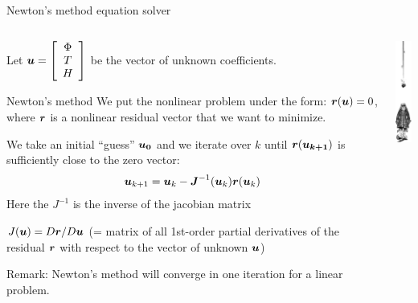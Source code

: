 \begin{frame}{Newton's method equation solver}

  \tiny

  \begin{columns}
  \begin{column}{9cm}
    Let $ \boldsymbol{u} = \left[\begin{array}{c} \Phi\\ T\\  H\\ \end{array}\right] $ be the vector of unknown coefficients.

  \begin{block}{Newton's method}
    We put the nonlinear problem under the form:
    $
      \boldsymbol{r} ( \boldsymbol{u} ) = 0 \nonumber
    $,
    where $ \boldsymbol{r} $ is a nonlinear residual vector that we want to minimize.

    We take an initial ``guess'' $ \boldsymbol{u_{0}} $ and we iterate over $ k $ until $ \boldsymbol{r} (\boldsymbol{u_{k+1}} ) $ is sufficiently close to the zero vector:
    \begin{align}
      \boldsymbol{u}_{k+1} = \boldsymbol{u}_{k} 
      - \boldsymbol{J}^{-1}(\boldsymbol{u}_{k}) \boldsymbol{r}(\boldsymbol{u}_{k}) \nonumber
    \end{align}
    Here the $ J^{-1} $ is the inverse of the jacobian matrix

    $ J (\boldsymbol{u}) = D\boldsymbol{r} / D\boldsymbol{u} $ (= matrix of all 1st-order partial derivatives of the residual $ \boldsymbol{r} $ with respect to the vector of unknown $ \boldsymbol{u} $)

  \end{block}

    Remark: Newton's method will converge in one iteration for a linear problem.

  \end{column}
  \begin{column}{3cm}

    \hspace{.5cm}
    \includegraphics[width=1cm]{figures/newton}

  \end{column}
  \end{columns}

\end{frame}
